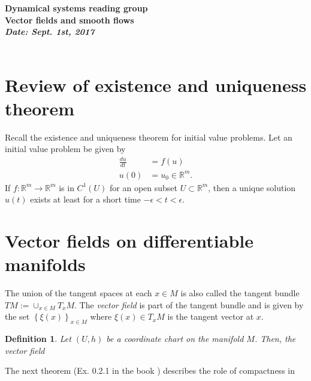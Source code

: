 \documentclass[11pt]{article}
\newtheorem{definition}{Definition}
\begin{document}
\begin{center}
{\large \bf	Dynamical systems reading group \\[1ex]
			Vector fields and smooth flows
\\[2ex]
	   	{\it Date: Sept. 1st, 2017} \hfill \\[-1.5ex]	  
 	\hrulefill \\
				
}
\end{center}


\section{Review of existence and uniqueness theorem }

Recall the existence and uniqueness theorem for initial value problems. 
Let an initial value problem be given by 
\begin{align}
		\frac{du}{dt} &= f(u) \\
		u(0) &= u_0 \in \mathbb{R}^m. 
\end{align}
If $f:\mathbb{R}^m \to \mathbb{R}^m$ is in $C^1(U)$ for an open subset $U \subset \mathbb{R}^m$, then a unique solution $u(t)$
exists at least for a short time $-\epsilon < t < \epsilon$.

\section{Vector fields on differentiable manifolds}

The union of the tangent spaces at each $x \in M$ is also called
the tangent bundle $TM := \cup_{x \in M} T_x M$. The \emph{vector field}
is part of the tangent bundle and is given by the set $\left\{\xi(x)\right\}_{x\in M}$
where $\xi(x) \in T_x M$ is the tangent vector at $x$.

\begin{definition}
Let $(U,h)$ be a coordinate chart on the manifold $M$. Then, the vector field    
\end{definition}

The next theorem (Ex. 0.2.1 in the book \cite{katok}) 
describes the role of compactness in 



\end{document}
